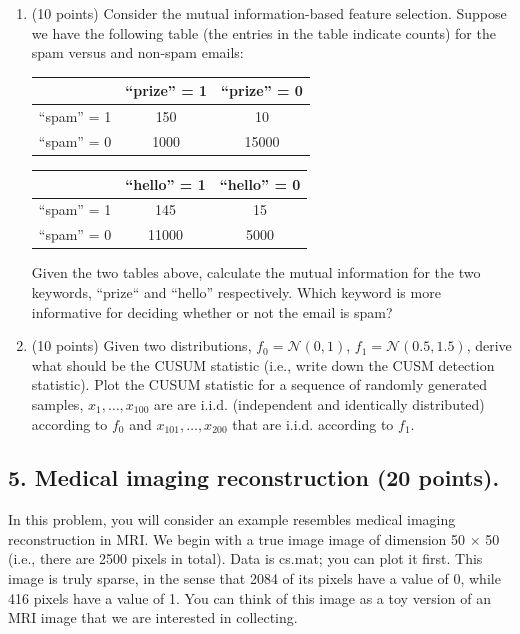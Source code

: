 \documentclass[12pt]{article}
\begin{document}
\begin{enumerate}

\item (10 points) Consider the mutual information-based feature selection. Suppose we have the following table (the entries in the table indicate counts) for the spam versus and non-spam emails:
%
\begin{center}
\begin{tabular}{c|c|c}
\hline
& ``prize'' = 1 & ``prize'' = 0 \\\hline
``spam'' = 1 & 150& 10 \\ \hline 
 ``spam'' = 0 & 1000 & 15000  \\\hline
\end{tabular}
\end{center}

\begin{center}
\begin{tabular}{c|c|c}
\hline
& ``hello'' = 1 & ``hello'' = 0 \\\hline
``spam'' = 1 & 145 & 15 \\ \hline 
 ``spam'' = 0 & 11000 & 5000  \\\hline
\end{tabular}
\end{center}

Given the two tables above, calculate the mutual information for the two keywords, ``prize`` and ``hello'' respectively. Which keyword is more informative for deciding whether or not the email is spam?

\item  (10 points)  Given two distributions, $f_0 = \mathcal{N}(0, 1)$, $f_1 = \mathcal{N}(0.5, 1.5)$, derive what should be the CUSUM statistic (i.e., write down the CUSM detection statistic). Plot the CUSUM statistic for a sequence of randomly generated samples, $x_1, \ldots, x_{100}$ are are i.i.d. (independent and identically distributed) according to $f_0$ and $x_{101}, \ldots, x_{200}$  that are i.i.d. according to $f_1$.


\end{enumerate}


\subsection*{5. Medical imaging reconstruction (20 points).} 

In this problem, you will consider an example resembles medical imaging reconstruction in MRI.  We begin with a true image image of dimension 50 $\times$ 50 (i.e., there are 2500 pixels in total). Data is \textsf{cs.mat}; you can plot it first. This image is truly sparse, in the sense that 2084 of its pixels have a value of 0, while 416 pixels have a value of 1. You can think of this image as a toy version of an MRI image that we are interested in collecting.
\end{document}
